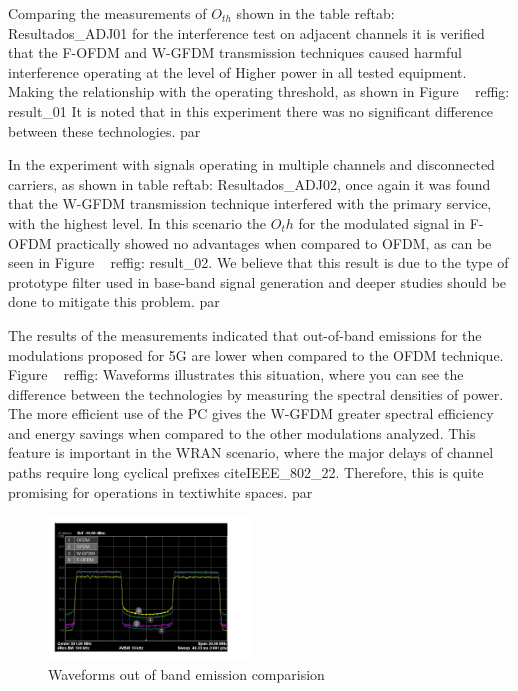 
Comparing the measurements of $O _{th} $ shown in the table ref{tab: Resultados_ADJ01} for the interference test on adjacent channels it is verified that the F-OFDM and W-GFDM transmission techniques caused harmful interference operating at the level of Higher power in all tested equipment. Making the relationship with the operating threshold, as shown in Figure ~ ref{fig: result_01} It is noted that in this experiment there was no significant difference between these technologies. par


In the experiment with signals operating in multiple channels and disconnected carriers, as shown in table ref{tab: Resultados_ADJ02}, once again it was found that the W-GFDM transmission technique interfered with the primary service, with the highest level. In this scenario the $O _th $ for the modulated signal in F-OFDM practically showed no advantages when compared to OFDM, as can be seen in Figure ~ ref{fig: result_02}. We believe that this result is due to the type of prototype filter used in base-band signal generation and deeper studies should be done to mitigate this problem. par

The results of the measurements indicated that out-of-band emissions for the modulations proposed for 5G are lower when compared to the OFDM technique. Figure ~ ref{fig: Waveforms} illustrates this situation, where you can see the difference between the technologies by measuring the spectral densities of power. The more efficient use of the PC gives the W-GFDM greater spectral efficiency and energy savings when compared to the other modulations analyzed. This feature is important in the WRAN scenario, where the major delays of channel paths require long cyclical prefixes cite{IEEE_802_22}. Therefore, this is quite promising for operations in texti{white spaces}. par

\begin{figure}[h]
    \centering
    \includegraphics[width=0.48\textwidth]{Figures/5G_WaveformsCompare.jpg}
    \caption{Waveforms out of band emission comparision}
    \label{fig:waveforms}
\end{figure}